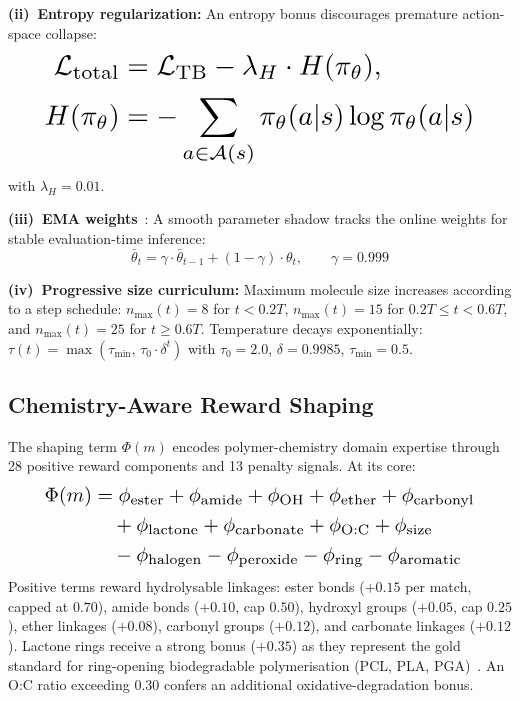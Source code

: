 \documentclass[twocolumn,10pt]{article}
\begin{document}
\noindent\textbf{(ii)~Entropy regularization:} An entropy bonus discourages premature action-space
collapse:
\begin{equation}
\resizebox{0.89\linewidth}{!}{$
\begin{aligned}
\mathcal{L}_\text{total} &= \mathcal{L}_\text{TB} - \lambda_H \cdot H(\pi_\theta), \\
H(\pi_\theta) &= -\sum_{a \in \mathcal{A}(s)} \pi_\theta(a|s) \log \pi_\theta(a|s)
\end{aligned}
$}
\end{equation}
with $\lambda_H = 0.01$.

\noindent\textbf{(iii)~EMA weights}~\cite{polyak1992acceleration}: A smooth parameter shadow tracks
the online weights for stable evaluation-time inference:
\begin{equation}
\bar{\theta}_t = \gamma \cdot \bar{\theta}_{t-1} + (1 - \gamma) \cdot \theta_t, \qquad \gamma = 0.999
\end{equation}

\noindent\textbf{(iv)~Progressive size curriculum:} Maximum molecule size increases according to a step schedule: $n_\text{max}(t) = 8$ for $t < 0.2T$, $n_\text{max}(t) = 15$ for $0.2T \leq t < 0.6T$, and $n_\text{max}(t) = 25$ for $t \geq 0.6T$. Temperature decays exponentially: $\tau(t) = \max(\tau_\text{min},\, \tau_0 \cdot \delta^t)$ with $\tau_0 = 2.0$, $\delta = 0.9985$, $\tau_\text{min} = 0.5$.

\subsection{Chemistry-Aware Reward Shaping}
The shaping term $\Phi(m)$ encodes polymer-chemistry domain expertise through 28 positive
reward components and 13 penalty signals. At its core:
\begin{equation}
\resizebox{0.89\linewidth}{!}{$
\begin{aligned}
\Phi(m) &= \phi_\text{ester} + \phi_\text{amide} + \phi_\text{OH} + \phi_\text{ether} + \phi_\text{carbonyl} \\
&\quad + \phi_\text{lactone} + \phi_\text{carbonate} + \phi_\text{O:C} + \phi_\text{size} \\
&\quad - \phi_\text{halogen} - \phi_\text{peroxide} - \phi_\text{ring} - \phi_\text{aromatic}
\end{aligned}
$}
\end{equation}
Positive terms reward hydrolysable linkages: ester bonds ($+0.15$ per match, capped at $0.70$),
amide bonds ($+0.10$, cap $0.50$), hydroxyl groups ($+0.05$, cap $0.25$), ether linkages
($+0.08$), carbonyl groups ($+0.12$), and carbonate linkages ($+0.12$). Lactone rings
receive a strong bonus ($+0.35$) as they represent the gold standard for ring-opening
biodegradable polymerisation (PCL, PLA, PGA)~\cite{woodruff2010return}. An O:C ratio
exceeding $0.30$ confers an additional oxidative-degradation bonus.
\end{document}
